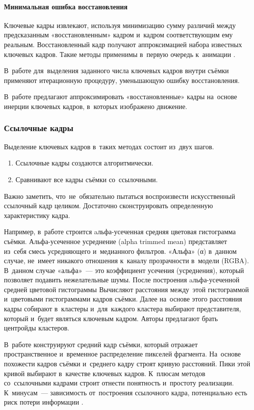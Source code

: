 \paragraph{Минимальная ошибка восстановления}


Ключевые кадры извлекают, используя минимизацию сумму различий между
предсказанным «восстановленным» кадром и~кадром соответствующим ему реальным.
Восстановленный кадр получают аппроксимацией набора известных ключевых кадров.
Такие методы применимы в~первую очередь к~анимации \cite{Hu:2011}.

В~работе \cite{Lee:2003} для~выделения заданного числа
ключевых кадров внутри съёмки применяют итерационную процедуру,
уменьшающую ошибку восстановления.

В~работе предлагают \cite{Liu:2004} аппроксимировать «восстановленные»
кадры на~основе инерции ключевых кадров, в~которых изображено движение.


\subsubsection{Ссылочные кадры}

Выделение ключевых кадров в~таких методах состоит из~двух шагов.
\begin{enumerate}
    \item Ссылочные кадры создаются алгоритмически.
    \item Сравнивают все кадры съёмки со~ссылочными.
\end{enumerate}
Важно заметить, что~не~обязательно пытаться воспроизвести
искусственный ссылочный кадр целиком. Достаточно сконструировать
определенную характеристику кадра.

Например, в~работе \cite{Ferman:2003} строится
aльфа-усеченная средняя цветовая гистограмма съёмки.
Альфа-усеченное усреднение (alpha trimmed mean) представляет из~себя
смесь усредняющего и~медианного фильтров.
«Альфа» (α) в~данном случае, не~имеет никакого отношения к~каналу прозрачности
в~модели (RGBA). В~данном случае «альфа»~— это коэффициент усечения (усреднения),
который позволяет подавить нежелательные шумы.
После построения aльфа-усеченной средней цветовой гистограммы
Вычисляют расстояния между~этой гистограммой и~цветовыми
гистограммами кадров съёмки.
Далее на~основе этого расстояния кадры собирают в~кластеры
и~для~каждого кластера выбирают представителя,
который и~будет являться ключевым кадром.
Авторы предлагают брать центройды кластеров.

В~работе \cite{Sun:2008} конструируют средний кадр съёмки,
который отражает пространственное и~временное распределение
пикселей фрагмента. На~основе похожести кадров съёмки
и~среднего кадру строят кривую расстояний.
Пики этой кривой выбирают в~качестве ключевых кадров.
К~плюсам методов со~ссылочными кадрами строит
отнести понятность и~простоту реализации.
К~минусам~— зависимость от~построения ссылочного кадра,
потенциально есть риск потери информации \cite{Nabeel:2014}.


